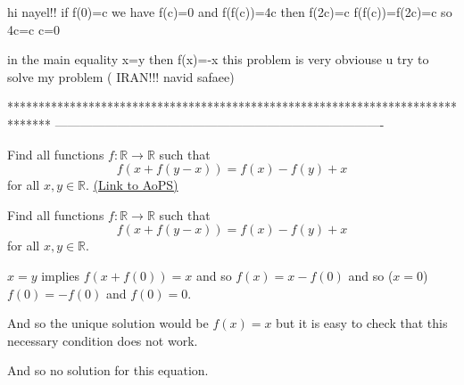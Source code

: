 \begin{solution}
	hi  nayel!! if   f(0)=c   we have f(c)=0 and  f(f(c))=4c   then f(2c)=c    f(f(c))=f(2c)=c   so 4c=c  c=0   

in the main equality x=y  then f(x)=-x  this problem is very obviouse u try to solve my problem ( IRAN!!! navid safaee)
\end{solution}
*******************************************************************************
-------------------------------------------------------------------------------

\begin{problem}
	Find all functions $ f: \mathbb R\to\mathbb R$ such that 
\[ f(x+f(y-x))=f(x)-f(y)+x\]
for all $ x,y\in\mathbb R$.
	\flushright \href{https://artofproblemsolving.com/community/c6h184076}{(Link to AoPS)}
\end{problem}



\begin{solution}
	\begin{tcolorbox}Find all functions $ f: \mathbb R\to\mathbb R$ such that
\[ f(x + f(y - x)) = f(x) - f(y) + x
\]
for all $ x,y\in\mathbb R$.\end{tcolorbox}

$ x = y$ implies $ f(x + f(0)) = x$ and so $ f(x) = x - f(0)$ and so ($ x = 0$) $ f(0) = - f(0)$ and $ f(0) = 0$.

And so the unique solution would be $ f(x) = x$ but it is easy to check that this necessary condition does not work.

And so no solution for this equation.
\end{solution}






